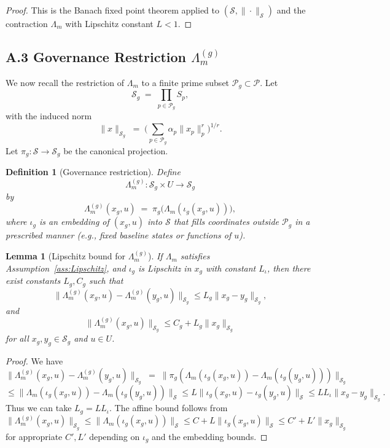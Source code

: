 \documentclass[11pt]{article}
\newtheorem{definition}[theorem]{Definition}
\newtheorem{lemma}[theorem]{Lemma}
\begin{document}
\begin{proof}
This is the Banach fixed point theorem applied to $(\mathcal{S},\|\cdot\|_{\mathcal{S}})$ and the contraction $\Lambda_m$ with Lipschitz constant $L<1$.
\end{proof}

\subsection{A.3 Governance Restriction $\Lambda_m^{(g)}$}

We now recall the restriction of $\Lambda_m$ to a finite prime subset $\mathcal{P}_g \subset \mathcal{P}$. Let
\[
  \mathcal{S}_g \;=\; \prod_{p \in \mathcal{P}_g} S_p,
\]
with the induced norm
\[
  \|x\|_{\mathcal{S}_g}
  \;=\; \Bigg(\sum_{p \in \mathcal{P}_g} \alpha_p \|x_p\|_p^r\Bigg)^{1/r}.
\]
Let $\pi_g : \mathcal{S} \to \mathcal{S}_g$ be the canonical projection.

\begin{definition}[Governance restriction]\label{def:Lambda-gov-appendix}
Define
\[
  \Lambda_m^{(g)} : \mathcal{S}_g \times U \to \mathcal{S}_g
\]
by
\[
  \Lambda_m^{(g)}(x_g, u)
  \;=\; \pi_g\big(\Lambda_m(\iota_g(x_g,u))\big),
\]
where $\iota_g$ is an embedding of $(x_g,u)$ into $\mathcal{S}$ that fills coordinates outside $\mathcal{P}_g$ in a prescribed manner (e.g., fixed baseline states or functions of $u$).
\end{definition}

\begin{lemma}[Lipschitz bound for $\Lambda_m^{(g)}$]\label{lem:Lambda-gov-Lipschitz}
If $\Lambda_m$ satisfies Assumption~\ref{ass:Lipschitz}, and $\iota_g$ is Lipschitz in $x_g$ with constant $L_\iota$, then there exist constants $L_g, C_g$ such that
\[
  \|\Lambda_m^{(g)}(x_g,u) - \Lambda_m^{(g)}(y_g,u)\|_{\mathcal{S}_g}
  \le L_g \|x_g - y_g\|_{\mathcal{S}_g},
\]
and
\[
  \|\Lambda_m^{(g)}(x_g,u)\|_{\mathcal{S}_g}
  \le C_g + L_g \|x_g\|_{\mathcal{S}_g}
\]
for all $x_g,y_g \in \mathcal{S}_g$ and $u \in U$.
\end{lemma}

\begin{proof}
We have
\[
  \|\Lambda_m^{(g)}(x_g,u) - \Lambda_m^{(g)}(y_g,u)\|_{\mathcal{S}_g}
  \;=\;
  \|\pi_g(\Lambda_m(\iota_g(x_g,u)) - \Lambda_m(\iota_g(y_g,u)))\|_{\mathcal{S}_g}
\]
\[
  \le \|\Lambda_m(\iota_g(x_g,u)) - \Lambda_m(\iota_g(y_g,u))\|_{\mathcal{S}}
  \le L \|\iota_g(x_g,u) - \iota_g(y_g,u)\|_{\mathcal{S}}
  \le L L_\iota \|x_g - y_g\|_{\mathcal{S}_g}.
\]
Thus we can take $L_g = L L_\iota$. The affine bound follows from
\[
  \|\Lambda_m^{(g)}(x_g,u)\|_{\mathcal{S}_g}
  \le
  \|\Lambda_m(\iota_g(x_g,u))\|_{\mathcal{S}}
  \le C + L \|\iota_g(x_g,u)\|_{\mathcal{S}}
  \le C' + L' \|x_g\|_{\mathcal{S}_g}
\]
for appropriate $C',L'$ depending on $\iota_g$ and the embedding bounds.
\end{proof}
\end{document}
